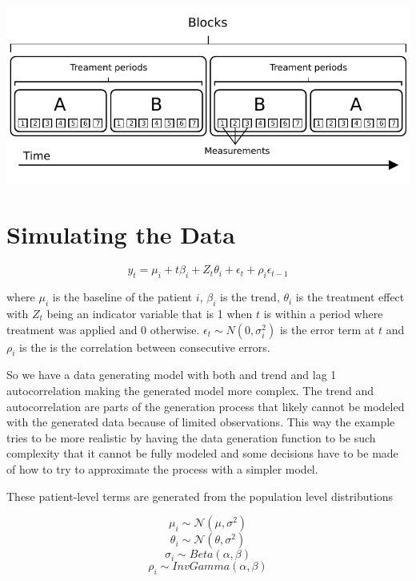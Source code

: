 \documentclass[12pt,a4paper,leqno]{report}
\theoremstyle{plain}
\theoremstyle{definition}
\theoremstyle{remark}
\begin{document}
\bigskip
{
    \centering
    \includegraphics{design_for_simulated_experiment.pdf}
    \par
}
\bigskip

\section{Simulating the Data}

\begin{def}\label{simulationmodel}
    \begin{equation}\label{}
        y_t = \mu_i + t\beta_i + Z_t\theta_i + \epsilon_t + \rho_i\epsilon_{t-1}
    \end{equation}
\end{def}where \(\mu_i\) is the baseline of the patient \(i\), \(\beta_i\) is
the trend, \(\theta_i\) is the treatment effect with \(Z_t\) being an indicator
variable that is 1 when \(t\) is within a period where treatment was applied and
0 otherwise. \(\epsilon_t \sim N(0,\sigma_i^2) \) is the error term at \(t\) and
\(\rho_i\) is the is the correlation between consecutive errors.

So we have a data generating model with both and trend and lag 1 autocorrelation
making the generated model more complex. The trend and autocorrelation are parts
of the generation process that likely cannot be modeled with the generated data
because of limited observations. This way the example tries to be more realistic
by having the data generation function to be such complexity that it cannot be
fully modeled and some decisions have to be made of how to try to approximate
the process with a simpler model.

These patient-level terms are generated from the population level distributions

\begin{def}\label{populationparameters}
    \begin{equation}
        \mu_i \sim \mathcal{N}(\mu,\sigma^2)
    \end{equation}
    \begin{equation}
        \theta_i \sim \mathcal{N}(\theta,\sigma^2)
    \end{equation}
    \begin{equation}
        \sigma_i \sim Beta(\alpha, \beta)
    \end{equation}
    \begin{equation}
        \rho_i \sim InvGamma(\alpha, \beta)
    \end{equation}
\end{def}
\end{document}
